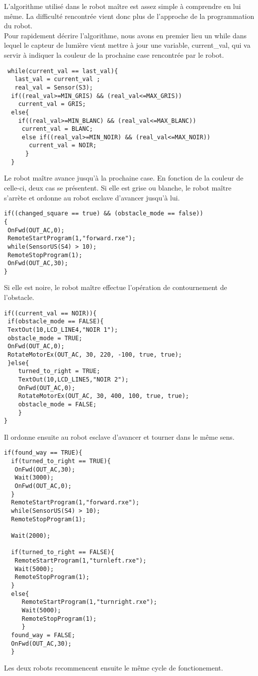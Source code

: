 L'algorithme utilisé dans le robot maître est assez simple à comprendre
en lui même. La difficulté rencontrée vient donc plus de l'approche de la
programmation du robot.
\\
Pour rapidement décrire l'algorithme, nous avons en premier lieu un
while dans lequel le capteur de lumière
vient mettre à jour une variable, current\_val, qui va servir à indiquer la couleur de la prochaine
case rencontrée par le robot.

\begin{verbatim} 
 while(current_val == last_val){
   last_val = current_val ;
   real_val = Sensor(S3);
  if((real_val>=MIN_GRIS) && (real_val<=MAX_GRIS))
    current_val = GRIS;
  else{
    if((real_val>=MIN_BLANC) && (real_val<=MAX_BLANC))
     current_val = BLANC;
     else if((real_val>=MIN_NOIR) && (real_val<=MAX_NOIR))
       current_val = NOIR;
      }
  } 
\end{verbatim}

Le robot maître avance jusqu'à la prochaine case. En fonction de la
couleur de celle-ci, deux cas se présentent.
Si elle est grise ou blanche, le robot maître s'arrète et ordonne au
robot esclave d'avancer jusqu'à lui.

\begin{verbatim}
if((changed_square == true) && (obstacle_mode == false))
{
 OnFwd(OUT_AC,0);
 RemoteStartProgram(1,"forward.rxe");
 while(SensorUS(S4) > 10);
 RemoteStopProgram(1);
 OnFwd(OUT_AC,30);
}
\end{verbatim}

Si elle est noire, le robot maître effectue l'opération de contournement
de l'obstacle.

\begin{verbatim} 
if((current_val == NOIR)){
 if(obstacle_mode == FALSE){
 TextOut(10,LCD_LINE4,"NOIR 1");
 obstacle_mode = TRUE;
 OnFwd(OUT_AC,0);
 RotateMotorEx(OUT_AC, 30, 220, -100, true, true);
 }else{
    turned_to_right = TRUE;
    TextOut(10,LCD_LINE5,"NOIR 2");
    OnFwd(OUT_AC,0);
    RotateMotorEx(OUT_AC, 30, 400, 100, true, true);
    obstacle_mode = FALSE;
    }
}
\end{verbatim}

Il ordonne ensuite au robot esclave d'avancer et tourner dans le même
sens. 

\begin{verbatim}
if(found_way == TRUE){
  if(turned_to_right == TRUE){
   OnFwd(OUT_AC,30);
   Wait(3000);
   OnFwd(OUT_AC,0);
  }
  RemoteStartProgram(1,"forward.rxe");
  while(SensorUS(S4) > 10);
  RemoteStopProgram(1);
 
  Wait(2000);
 
  if(turned_to_right == FALSE){
   RemoteStartProgram(1,"turnleft.rxe");
   Wait(5000);
   RemoteStopProgram(1);
  }
  else{
     RemoteStartProgram(1,"turnright.rxe");
     Wait(5000);
     RemoteStopProgram(1);
     }
  found_way = FALSE;
  OnFwd(OUT_AC,30);
  }
\end{verbatim}

Les deux robots recommencent ensuite le même cycle de fonctionement.
